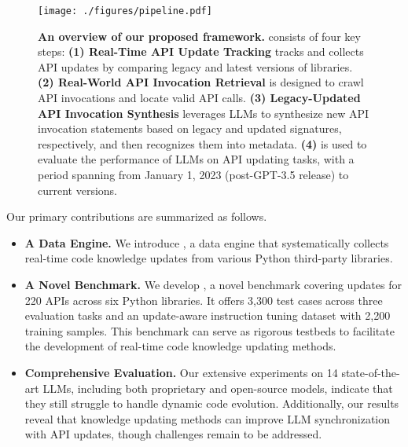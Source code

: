 \begin{figure*}[!t]
	\centering
	\texttt{[image: ./figures/pipeline.pdf]}
         \vspace{-1em}
         \caption{\textbf{An overview of our proposed \method framework.} \method consists of four key steps: \textbf{(1) Real-Time API Update Tracking} tracks and collects API updates by comparing legacy and latest versions of libraries. \textbf{(2) Real-World API Invocation Retrieval} is designed to crawl API invocations and locate valid API calls. \textbf{(3) Legacy-Updated API Invocation Synthesis} leverages LLMs to synthesize new API invocation statements based on legacy and updated signatures, respectively, and then recognizes them into metadata. \textbf{(4) \benchmark} is used to evaluate the performance of LLMs on API updating tasks, with a period spanning from January 1, 2023 (post-GPT-3.5 release) to current versions.}
	\label{fig_framework}
	\vspace{-1em}
\end{figure*}

Our primary contributions are summarized as follows.
\begin{itemize}[leftmargin=4mm, itemsep=0.05mm]
\item \textbf{A Data Engine.} We introduce \method, a data engine that systematically collects real-time code knowledge updates from various Python third-party libraries. 
\item \textbf{A Novel Benchmark.} We develop \benchmark, a novel benchmark covering updates for 220 APIs across six Python libraries. It offers 3,300 test cases across three evaluation tasks and an update-aware instruction tuning dataset with 2,200 training samples.
This benchmark can serve as rigorous testbeds to facilitate the development of real-time code knowledge updating methods.
\item \textbf{Comprehensive Evaluation.} Our extensive experiments on 14 state-of-the-art LLMs, including both proprietary and open-source models, indicate that they still struggle to handle dynamic code evolution.
Additionally, our results reveal that knowledge updating methods can improve LLM synchronization with API updates, though challenges remain to be addressed. 
\end{itemize}

